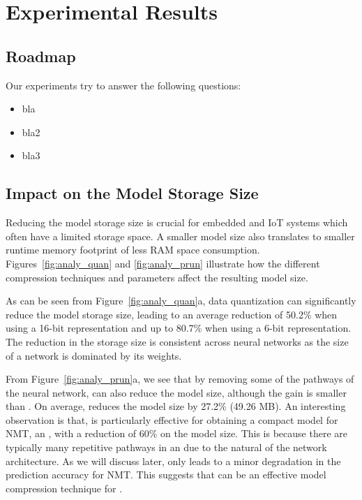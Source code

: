 \section{Experimental Results}


\subsection{Roadmap}
Our experiments try to answer the following questions:

\begin{itemize}
\item bla
\item bla2
\item bla3
\end{itemize}

\subsection{Impact on the Model Storage Size\label{sec:ms}}
Reducing the model storage size is crucial for embedded and IoT systems which often have a limited storage space. A smaller model size also
translates to smaller runtime memory footprint of less RAM space consumption. Figures~\ref{fig:analy_quan} and  \ref{fig:analy_prun}
illustrate how the different compression techniques and parameters affect the resulting model size.

As can be seen from Figure~\ref{fig:analy_quan}a, data quantization can significantly reduce the model storage size, leading to an average
reduction of 50.2\% when using a 16-bit representation and up to 80.7\% when using a 6-bit representation. The reduction in the storage
size is consistent across neural networks as the size of a network is dominated by its weights.

From Figure~\ref{fig:analy_prun}a, we see that by removing some of the pathways of the neural network, \pruning can also reduce the model
size, although the gain is smaller than \quantization. On average, \pruning reduces the model size by 27.2\% (49.26 MB). An interesting
observation is that, \pruning is particularly effective for obtaining a compact model for NMT, an \RNN, with a reduction of 60\% on the
model size. This is because there are typically many repetitive pathways in an \RNN due to the natural of the network architecture. As we
will discuss later, \pruning only leads to a minor degradation in the prediction accuracy for NMT. This suggests that \pruning can be an
effective model compression technique for \RNNs.



